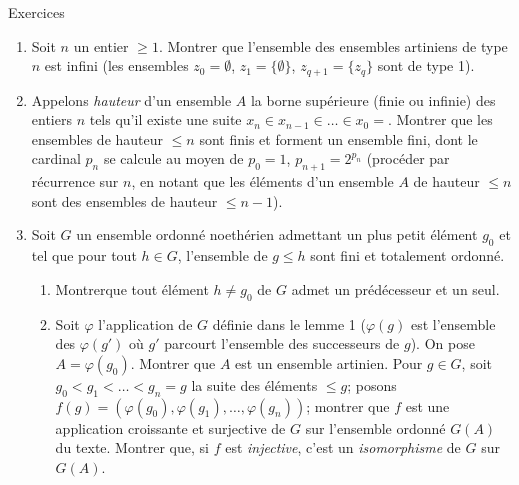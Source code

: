 \documentclass[10pt]{../fichiers-configuration-latex/smfart}
\def\labelenumi{(\theenumi)}
\def\labelenumii{(\theenumii)}
\begin{document}
\begin{enonce*}[remark]{Exercices}
\begin{enumerate}
\renewcommand{\labelenumi}{\theenumi)}
\item Soit $n$ un entier $\geq 1$. Montrer que l'ensemble des ensembles
artiniens de type $n$ est infini (les ensembles $z_0=∅$,
$z_1=\{∅\}$, $z_{q+1}=\{z_q\}$ sont de type 1).

\item Appelons \emph{hauteur} d'un ensemble $A$ la borne supérieure
(finie ou infinie) des entiers $n$ tels qu'il existe une suite
$x_n\in x_{n-1}\in \ldots \in x_0=$. Montrer que les ensembles de
hauteur $\leq n$ sont finis et forment un ensemble fini, dont le
cardinal $p_n$ se calcule au moyen de $p_0=1$, $p_{n+1}=2^{p_n}$
(procéder par récurrence sur $n$, en notant que les éléments d'un
ensemble $A$ de hauteur $\leq n$ sont des ensembles de hauteur $\leq
n-1$).

\item Soit $G$ un ensemble ordonné noethérien admettant un plus
petit élément $g_0$ et tel que pour tout $h\in G$, l'ensemble de
$g\leq h$ sont fini et totalement ordonné.
\begin{enumerate}
\renewcommand{\theenumii}{\alph{enumii}}
\renewcommand{\labelenumii}{\theenumii)}
\item Montrer\pageoriginale que tout élément $h\neq g_0$ de $G$
admet un prédécesseur et un seul.

\item Soit $\varphi$ l'application de $G$ définie dans le lemme 1
(\ie $\varphi(g)$ est l'ensemble des $\varphi(g')$ où $g'$ parcourt
l'ensemble des successeurs de $g$). On pose $A=\varphi(g_0)$.
Montrer que $A$ est un ensemble artinien. Pour $g\in G$, soit
$g_0<g_1<\ldots<g_n=g$ la suite des éléments $\leq g$; posons
$f(g)=(\varphi(g_0),\varphi(g_1),\ldots,\varphi(g_n))$; montrer que
$f$ est une application croissante et surjective de $G$ sur
l'ensemble ordonné $G(A)$ du texte. Montrer que, si $f$ est
\emph{injective}, c'est un \emph{isomorphisme} de $G$ sur $G(A)$.


\end{enumerate}
\end{enumerate}
\end{enonce*}
\end{document}
